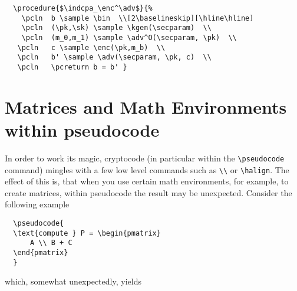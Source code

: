 \documentclass[a4paper]{report}
\begin{document}
  \begin{center}
  \end{center}
  
  \begin{lstlisting}
  \procedure{$\indcpa_\enc^\adv$}{%
	\pcln  b \sample \bin  \\[2\baselineskip][\hline\hline]
	\pcln  (\pk,\sk) \sample \kgen(\secparam)  \\
	\pcln  (m_0,m_1) \sample \adv^O(\secparam, \pk)  \\
   \pcln   c \sample \enc(\pk,m_b)  \\
   \pcln   b' \sample \adv(\secparam, \pk, c)  \\
   \pcln   \pcreturn b = b' }
  \end{lstlisting}
  
  \section{Matrices and Math Environments within pseudocode}
  
  In order to work its magic, cryptocode (in particular within the \lstinline{\pseudocode} command) mingles with a few low level commands such as
  \lstinline{\\} or \lstinline{\halign}. The effect of this is, that when you use certain math environments, for example, to create matrices, within pseudocode
  the result may be unexpected. Consider the following example
  
  \begin{lstlisting}
  \pseudocode{
  \text{compute } P = \begin{pmatrix}
	  A \\ B + C
  \end{pmatrix}
  }
  \end{lstlisting}
  
  which, somewhat unexpectedly, yields
  
  \begin{center}
  \end{center}
  
\end{document}
